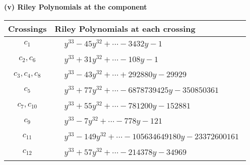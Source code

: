 \documentclass[1p]{elsarticle_modified}
\theoremstyle{definition}
\begin{document}
\newpage\renewcommand{\arraystretch}{1}
\flushleft \textbf{(v) Riley Polynomials at the component}\newline \\
\begin{tabular}{m{50pt}|m{274pt}}
Crossings & \hspace{64pt}Riley Polynomials at each crossing \\
\hline $$\begin{aligned}c_{1}\end{aligned}$$&$\begin{aligned}
&y^{33}-45 y^{32}+\cdots-3432 y-1
\end{aligned}$\\
\hline $$\begin{aligned}c_{2},c_{6}\end{aligned}$$&$\begin{aligned}
&y^{33}+31 y^{32}+\cdots-108 y-1
\end{aligned}$\\
\hline $$\begin{aligned}c_{3},c_{4},c_{8}\end{aligned}$$&$\begin{aligned}
&y^{33}-43 y^{32}+\cdots+292880 y-29929
\end{aligned}$\\
\hline $$\begin{aligned}c_{5}\end{aligned}$$&$\begin{aligned}
&y^{33}+77 y^{32}+\cdots-6878739425 y-350850361
\end{aligned}$\\
\hline $$\begin{aligned}c_{7},c_{10}\end{aligned}$$&$\begin{aligned}
&y^{33}+55 y^{32}+\cdots-781200 y-152881
\end{aligned}$\\
\hline $$\begin{aligned}c_{9}\end{aligned}$$&$\begin{aligned}
&y^{33}-7 y^{32}+\cdots-778 y-121
\end{aligned}$\\
\hline $$\begin{aligned}c_{11}\end{aligned}$$&$\begin{aligned}
&y^{33}-149 y^{32}+\cdots-105634649180 y-23372600161
\end{aligned}$\\
\hline $$\begin{aligned}c_{12}\end{aligned}$$&$\begin{aligned}
&y^{33}+57 y^{32}+\cdots-214378 y-34969
\end{aligned}$\\
\hline
\end{tabular}\\~\\
\end{document}
